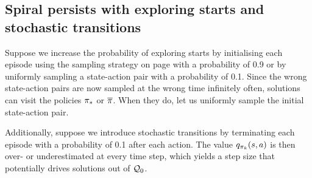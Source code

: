 \subsection{Spiral persists with exploring starts and stochastic transitions}
\label{sec: counter 3s es st}

\vspace{-0.3cm}

Suppose we increase the probability of exploring starts
by initialising each episode using the sampling strategy on page \pageref{pg: sampling strat 3 states} with a probability of 0.9 
or by uniformly sampling a state-action pair with a probability of 0.1.
Since the wrong state-action pairs are now sampled at the wrong time infinitely often,
solutions can visit the policies ${\pi}_*$ or $\overline{\pi}$.
When they do, let us uniformly sample the initial state-action pair.

\vspace{-0.1cm}

Additionally, suppose we introduce stochastic transitions by terminating each episode with a probability of 0.1 after each action.
The value $q_{\pi_k}(s,a)$ is then over- or underestimated at every time step, which yields a step size that potentially drives solutions out of $\mathcal{Q}_0$.

\vspace{-0.1cm}


